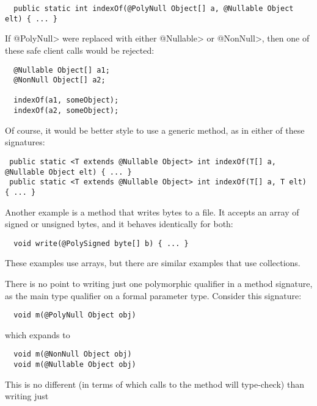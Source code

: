 \begin{Verbatim}
  public static int indexOf(@PolyNull Object[] a, @Nullable Object elt) { ... }
\end{Verbatim}

If \<@PolyNull> were replaced with either \<@Nullable> or \<@NonNull>, then
one of these safe client calls would be rejected:

\begin{Verbatim}
  @Nullable Object[] a1;
  @NonNull Object[] a2;

  indexOf(a1, someObject);
  indexOf(a2, someObject);
\end{Verbatim}

Of course, it would be better style to use a generic method, as in either
of these signatures:

\begin{Verbatim}
 public static <T extends @Nullable Object> int indexOf(T[] a, @Nullable Object elt) { ... }
 public static <T extends @Nullable Object> int indexOf(T[] a, T elt) { ... }
\end{Verbatim}


Another example is a method that writes bytes to a file.  It accepts an
array of signed or unsigned bytes, and it behaves identically for both:

\begin{Verbatim}
  void write(@PolySigned byte[] b) { ... }
\end{Verbatim}


These examples use arrays, but there are similar examples that
use collections.



There is no point to writing just one polymorphic qualifier in a method
signature, as the main type qualifier on a formal parameter type.
Consider this signature:

\begin{Verbatim}
  void m(@PolyNull Object obj)
\end{Verbatim}

\noindent
which expands to

\begin{Verbatim}
  void m(@NonNull Object obj)
  void m(@Nullable Object obj)
\end{Verbatim}

This is no different (in terms of which calls to the method will
type-check) than writing just

